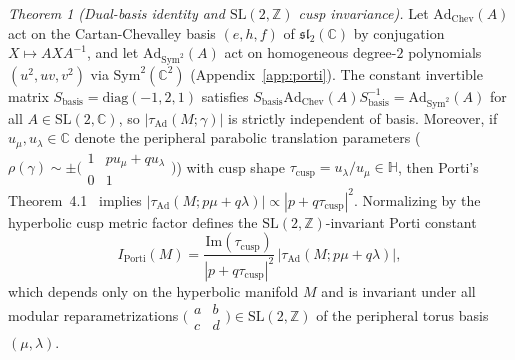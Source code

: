 \documentclass[aps,prd,twocolumn,nofootinbib,floatfix]{revtex4-2}
\begin{document}
\emph{Theorem 1 (Dual-basis identity and $\mathrm{SL}(2,\mathbb{Z})$ cusp invariance).}
Let $\mathrm{Ad}_{\mathrm{Chev}}(A)$ act on the Cartan-Chevalley basis $(e, h, f)$ of $\mathfrak{sl}_2(\mathbb{C})$ by conjugation $X \mapsto A X A^{-1}$, and let $\mathrm{Ad}_{\mathrm{Sym}^2}(A)$ act on homogeneous degree-$2$ polynomials $(u^2, uv, v^2)$ via $\mathrm{Sym}^2(\mathbb{C}^2)$ (Appendix~\ref{app:porti}).
The constant invertible matrix $S_{\mathrm{basis}} = \mathrm{diag}(-1, 2, 1)$ satisfies $S_{\mathrm{basis}}\mathrm{Ad}_{\mathrm{Chev}}(A)S_{\mathrm{basis}}^{-1} = \mathrm{Ad}_{\mathrm{Sym}^2}(A)$ for all $A \in \mathrm{SL}(2,\mathbb{C})$, so $|\tau_{\mathrm{Ad}}(M;\gamma)|$ is strictly independent of basis.
Moreover, if $u_\mu, u_\lambda \in \mathbb{C}$ denote the peripheral parabolic translation parameters ($\rho(\gamma) \sim \pm\bigl(\begin{smallmatrix} 1 & p u_\mu + q u_\lambda \\ 0 & 1 \end{smallmatrix}\bigr)$) with cusp shape $\tau_{\mathrm{cusp}} = u_\lambda / u_\mu \in \mathbb{H}$, then Porti's Theorem~4.1~\cite{Porti1997} implies $|\tau_{\mathrm{Ad}}(M; p\mu + q\lambda)| \propto |p + q\tau_{\mathrm{cusp}}|^2$.
Normalizing by the hyperbolic cusp metric factor defines the $\mathrm{SL}(2,\mathbb{Z})$-invariant Porti constant
\begin{equation}
\label{eq:i_porti}
I_{\mathrm{Porti}}(M) = \frac{\mathrm{Im}(\tau_{\mathrm{cusp}})}{|p + q\tau_{\mathrm{cusp}}|^2}\,\bigl|\tau_{\mathrm{Ad}}(M; p\mu + q\lambda)\bigr|,
\end{equation}
which depends only on the hyperbolic manifold $M$ and is invariant under all modular reparametrizations $\bigl(\begin{smallmatrix} a & b \\ c & d \end{smallmatrix}\bigr) \in \mathrm{SL}(2,\mathbb{Z})$ of the peripheral torus basis $(\mu,\lambda)$.
\end{document}
